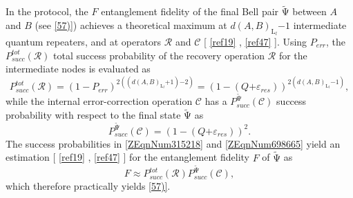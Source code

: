 \documentclass[11pt]{article}%
\newcommand*{\cref}[1]{%
  \begingroup
    \hypersetup{
      linkcolor=linkequation,
      linkbordercolor=linkequation,
    }%
    \ref{#1}%
  \endgroup
}
\begin{document}
 In the protocol, the $F$ entanglement fidelity of the final Bell pair $\widetilde{\mathrm{\Psi }}$ between $A$ and $B$ (see \eqref{57)}) achieves a theoretical maximum at $d{\left(A,B\right)}_{{\mathrm{L}}_l}\mathrm{-}\mathrm{1}$ intermediate quantum repeaters, and at operators $\mathcal{R}$ and $\mathcal{C}$ [\cref{ref19}, \cref{ref47}]. Using $P_{err}$, the $P^{tot}_{succ}\left(\mathcal{R}\right)$ total success probability of the recovery operation $\mathcal{R}$ for the intermediate nodes is evaluated as
\begin{equation} \label{ZEqnNum315218} 
P^{tot}_{succ}\left(\mathcal{R}\right)\mathrm{=}{\left(\mathrm{1-}P_{err}\right)}^{\mathrm{2}\left(\left(d{\left(A,B\right)}_{{\mathrm{L}}_l}\mathrm{+1}\right)\mathrm{-}\mathrm{2}\right)}\mathrm{=}{\left(\mathrm{1-}\left(Q\mathrm{+}{\varepsilon }_{res}\right)\right)}^{\mathrm{2}\left(d{\left(A,B\right)}_{{\mathrm{L}}_l}\mathrm{-}\mathrm{1}\right)}, 
\end{equation} 
while the internal error-correction operation $\mathcal{C}$ has a $P^{\widetilde{\mathrm{\Psi }}}_{succ}\left(\mathcal{C}\right)$ success probability with respect to the final state $\widetilde{\mathrm{\Psi }}$ as
\begin{equation} \label{ZEqnNum698665} 
P^{\widetilde{\mathrm{\Psi }}}_{succ}\left(\mathcal{C}\right)\mathrm{=}{\left(\mathrm{1-}\left(Q\mathrm{+}{\varepsilon }_{res}\right)\right)}^{\mathrm{2}}. 
\end{equation} 
The success probabilities in \eqref{ZEqnNum315218} and \eqref{ZEqnNum698665} yield an estimation [\cref{ref19}, \cref{ref47}] for the entanglement fidelity $F$ of $\widetilde{\mathrm{\Psi }}$ as
\begin{equation} \label{61)} 
F\mathrm{\approx }P^{tot}_{succ}\left(\mathcal{R}\right)P^{\widetilde{\mathrm{\Psi }}}_{succ}\left(\mathcal{C}\right), 
\end{equation} 
which therefore practically yields \eqref{57)}.
\end{document}
